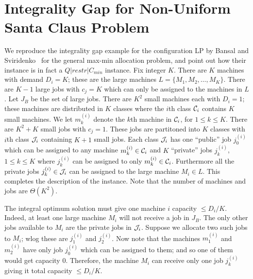 \documentclass{article}[11pt]
\begin{document}
%













\section{Integrality Gap for Non-Uniform Santa Claus Problem}\label{sec:app-bsig}
We reproduce the integrality gap example for the configuration LP by Bansal and Sviridenko~\cite{BansalS06} for the general max-min allocation problem, and point out how their instance is in fact a $Q|restr|C_{min}$ instance.
Fix integer $K$. There are $K$ machines with demand $D_i = K$; these are the large machines $L = \{M_1,M_2,\ldots,M_K\}$. There are $K-1$ large jobs with $c_j = K$ which can only be assigned to the machines in $L$.
Let $J_B$ be the set of large jobs. There are $K^2$ small machines each with $D_i = 1$; these machines are distributed in $K$ classes where the $i$th class ${\cal C}_i$ contains $K$ small machines. We let $m^{(i)}_k$ denote the $k$th machine in ${\cal C}_i$, for $1\leq k\leq K$.
There are $K^2 + K$ small jobs with $c_j = 1$. These jobs are partitoned into $K$ classes with $i$th class ${\cal J}_i$ containing $K+1$ small jobs. Each class ${\cal J}_i$ has one ``public'' job $j^{(i)}_0$ which can be assigned to any machine $m^{(i)}_k \in {\cal C}_i$
 and $K$ ``private'' jobs $j^{(i)}_k$, $1\leq k\leq K$ where $j^{(i)}_k$ can be assigned to only $m^{(i)}_k \in {\cal C}_i$. Furthermore all the private jobs $j^{(i)}_k\in {\cal J}_i$ can be assigned to the large machine $M_i \in L$. This completes the description of the instance.
Note that the number of machines and jobs are $\Theta(K^2)$.

The integral optimum solution must give one machine $i$ capacity $\leq D_i/K$. Indeed, at least one large machine $M_i$ will not receive a job in $J_B$.
The only other jobs available to $M_i$ are the private jobs in ${\cal J}_i$. Suppose we allocate two such jobs to $M_i$; wlog these are $j^{(i)}_1$ and $j^{(i)}_2$. Now note
that the machines $m^{(i)}_1$ and $m^{(i)}_2$ have only job $j^{(i)}_0$ which can be assigned to them; and so one of them would get capacity $0$.
Therefore, the machine $M_i$ can receive only one job $j^{(i)}_k$ giving it total capacity $\leq D_i/K$.
\end{document}
